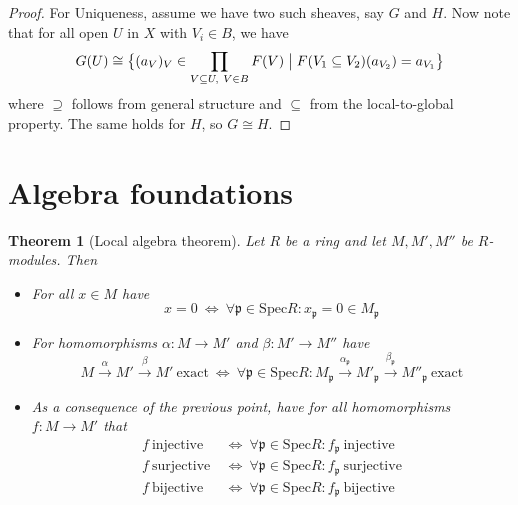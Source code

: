 \documentclass{scrartcl}
\newcommand{\Spec}{\mathrm{Spec}}
\newtheorem{theorem}[prop]{Theorem}
\theoremstyle{definition}
\begin{document}
\begin{proof}
    For Uniqueness, assume we have two such sheaves, say $G$ and $H$.
    Now note that for all open $U$ in $X$ with $V_i \in B$, we have
    \begin{equation*}
        G(U) \cong \bigl\{ (a_V)_V \in \prod_{V \subseteq U, \ V \in B} F(V) \bigm| F(V_1 \subseteq V_2)(a_{V_2}) = a_{V_1} \bigr\}
    \end{equation*}
    where $\supseteq$ follows from general structure and $\subseteq$ from the local-to-global property.
    The same holds for $H$, so $G \cong H$.
\end{proof}

\section{Algebra foundations}
\begin{theorem}[Local algebra theorem]
    Let $R$ be a ring and let $M, M', M''$ be $R$-modules.
    Then
    \begin{itemize}
        \item For all $x \in M$ have
        \begin{equation*}
            x = 0 \ \Leftrightarrow \ \forall \mathfrak{p} \in \Spec R: x_{\mathfrak{p}} = 0 \in M_{\mathfrak{p}}
        \end{equation*}
        \item For homomorphisms $\alpha: M \to M'$ and $\beta: M' \to M''$ have
        \begin{equation*}
            M \overset{\alpha}{\to} M' \overset{\beta}{\to} M' \ \text{exact} \ \Leftrightarrow \ \forall \mathfrak{p} \in \Spec R: M_{\mathfrak{p}} \overset{\alpha_{\mathfrak{p}}}{\to} M'_{\mathfrak{p}} \overset{\beta_{\mathfrak{p}}}{\to} M''_{\mathfrak{p}} \ \text{exact}
        \end{equation*}
        \item As a consequence of the previous point, have for all homomorphisms $f: M \to M'$ that
        \begin{align*}
            f \ \text{injective} \ &\Leftrightarrow \ \forall \mathfrak{p} \in \Spec R: f_{\mathfrak{p}} \ \text{injective} \\
            f \ \text{surjective} \ &\Leftrightarrow \ \forall \mathfrak{p} \in \Spec R: f_{\mathfrak{p}} \ \text{surjective} \\
            f \ \text{bijective} \ &\Leftrightarrow \ \forall \mathfrak{p} \in \Spec R: f_{\mathfrak{p}} \ \text{bijective}       \end{align*} 
    \end{itemize}
\end{theorem}
\end{document}
